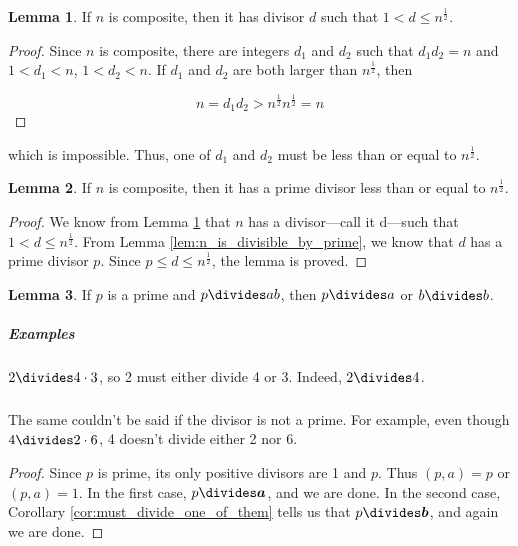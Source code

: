 \documentclass{article}
\theoremstyle{definition} %
\theoremstyle{definition}
\theoremstyle{definition}
\newtheorem{lemma}{Lemma}[section]
\theoremstyle{definition}
\begin{document}
  \begin{lemma}
    If $n$ is composite, then it has divisor $d$ such that $1 < d \leq n^\frac{1}{2}$.
    \label{lem:has_divisor_leq_sqrt}
  \end{lemma}
  
  \begin{proof}
    Since $n$ is composite, there are integers $d_1$ and $d_2$ such that $d_1d_2 = n$
    and $1 < d_1 < n$, $1 < d_2 < n$. If $d_1$ and $d_2$ are both larger than $n^\frac{1}{2}$,
    then
    
    \begin{equation*}
      n = d_1d_2 > n^\frac{1}{2} n^\frac{1}{2} = n
    \end{equation*}
  \end{proof}
  
  which is impossible. Thus, one of $d_1$ and $d_2$ must be less than or equal to $n^\frac{1}{2}$.
  
  \begin{lemma}
    If $n$ is composite, then it has a prime divisor less than or equal to $n^\frac{1}{2}$.
  \end{lemma}
  
  \begin{proof}
    We know from Lemma \ref{lem:has_divisor_leq_sqrt} that $n$ has a divisor---call it d---such that $1 < d \leq n^\frac{1}{2}$.
    From Lemma \ref{lem:n_is_divisible_by_prime}, we know that $d$ has a prime divisor $p$. Since $p \leq d \leq n^\frac{1}{2}$,
    the lemma is proved.
  \end{proof}
  
  \begin{lemma}
    If $p$ is a prime and $p \divides ab$, then $p \divides a$ or $b \divides b$.
    \label{lem:prime_must_divide_one_of_two}
  \end{lemma}
  
  \subparagraph{Examples} $2 \divides 4 \cdot 3$, so 2 must either divide 4 or 3.
  Indeed, $2 \divides 4$.
  
  \subparagraph{} The same couldn't be said if the divisor is not a prime. For example, even though
  $4 \divides 2 \cdot 6$, 4 doesn't divide either 2 nor 6.
  
  \begin{proof}
    Since $p$ is prime, its only positive divisors are 1 and $p$. Thus $(p, a) = p$ or
    $(p, a) = 1$. In the first case, $p \divides \bm{a}$, and we are done. In the second case,
    Corollary \ref{cor:must_divide_one_of_them} tells us that $p \divides \bm{b}$, and again we are done.
  \end{proof}
  
\end{document}
